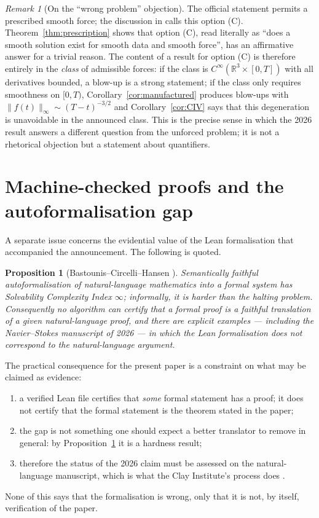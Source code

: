 \documentclass[11pt]{article}
\newtheorem{proposition}[theorem]{Proposition}
\theoremstyle{remark}
\newtheorem{remark}[theorem]{Remark}
\newcommand{\R}{\mathbb{R}}
\newcommand{\norm}[1]{\lVert #1\rVert}
\begin{document}
\begin{remark}[On the ``wrong problem'' objection]\label{rem:wrong}
The official statement \cite{Fefferman2000} permits a prescribed smooth force; the discussion
in \cite{SciAm2026} calls this option (C). Theorem~\ref{thm:prescription} shows that option
(C), read literally as ``does a smooth solution exist for smooth data and smooth force'', has
an affirmative answer for a trivial reason. The content of a result for option (C) is
therefore entirely in the \emph{class} of admissible forces: if the class is
$C^\infty(\R^3\times[0,T])$ with all derivatives bounded, a blow-up is a strong statement; if
the class only requires smoothness on $[0,T)$, Corollary~\ref{cor:manufactured} produces
blow-ups with $\norm{f(t)}_\infty\sim(T-t)^{-3/2}$ and Corollary~\ref{cor:CIV} says that this
degeneration is unavoidable in the announced class. This is the precise sense in which the
2026 result answers a different question from the unforced problem; it is not a rhetorical
objection but a statement about quantifiers.
\end{remark}

\section{Machine-checked proofs and the autoformalisation gap}\label{sec:lean}

A separate issue concerns the evidential value of the Lean formalisation that accompanied the
announcement. The following is quoted.

\begin{proposition}[Bastounis--Circelli--Hansen {\rm\cite{BCH2026}}]\label{prop:lean}
Semantically faithful autoformalisation of natural-language mathematics into a formal system
has Solvability Complexity Index $\infty$; informally, it is harder than the halting problem.
Consequently no algorithm can certify that a formal proof is a faithful translation of a given
natural-language proof, and there are explicit examples --- including the Navier--Stokes
manuscript of 2026 --- in which the Lean formalisation does not correspond to the
natural-language argument.
\end{proposition}

The practical consequence for the present paper is a constraint on what may be claimed as
evidence:
\begin{enumerate}[label=(\alph*),leftmargin=*]
\item a verified Lean file certifies that \emph{some} formal statement has a proof; it does not
      certify that the formal statement is the theorem stated in the paper;
\item the gap is not something one should expect a better translator to remove in general: by
      Proposition~\ref{prop:lean} it is a hardness result;
\item therefore the status of the 2026 claim must be assessed on the natural-language
      manuscript, which is what the Clay Institute's process does \cite{ClayNS}.
\end{enumerate}
None of this says that the formalisation is wrong, only that it is not, by itself,
verification of the paper.
\end{document}
